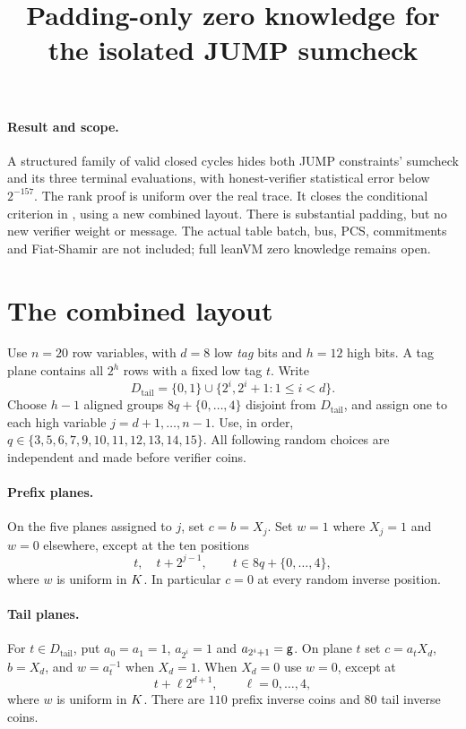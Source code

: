 \documentclass[11pt]{article}
\title{Padding-only zero knowledge for the isolated JUMP sumcheck}
\author{}
\date{}
\begin{document}
\maketitle
\vspace{-2em}

\paragraph{Result and scope.} A structured family of valid closed cycles hides both JUMP constraints' sumcheck and its three terminal evaluations, with honest-verifier statistical error below $2^{-157}$. The rank proof is uniform over the real trace. It closes the conditional criterion in , using a new combined layout. There is substantial padding, but no new verifier weight or message. The actual table batch, bus, PCS, commitments and Fiat-Shamir are not included; full leanVM zero knowledge remains open.

\section{The combined layout}

Use $n=20$ row variables, with $d=8$ low \emph{tag} bits and $h=12$ high bits. A tag plane contains all $2^h$ rows with a fixed low tag $t$. Write
\[
 D_{\mathrm{tail}}=\{0,1\}\cup\{2^i,2^i+1:1\le i<d\}.
\]
Choose $h-1$ aligned groups $8q+\{0,\ldots,4\}$ disjoint from $D_{\mathrm{tail}}$, and assign one to each high variable $j=d+1,\ldots,n-1$. Use, in order, $q\in\{3,5,6,7,9,10,11,12,13,14,15\}$. All following random choices are independent and made before verifier coins.

\paragraph{Prefix planes.} On the five planes assigned to $j$, set $c=b=X_j$. Set $w=1$ where $X_j=1$ and $w=0$ elsewhere, except at the ten positions
\[
 t,\quad t+2^{j-1},\qquad t\in8q+\{0,\ldots,4\},
\]
where $w$ is uniform in $K$. In particular $c=0$ at every random inverse position.

\paragraph{Tail planes.} For $t\in D_{\mathrm{tail}}$, put $a_0=a_1=1$, $a_{2^i}=1$ and $a_{2^i+1}=\mathsf{g}$. On plane $t$ set $c=a_tX_d$, $b=X_d$, and $w=a_t^{-1}$ when $X_d=1$. When $X_d=0$ use $w=0$, except at
\[
 t+\ell 2^{d+1},\qquad \ell=0,\ldots,4,
\]
where $w$ is uniform in $K$. There are $110$ prefix inverse coins and $80$ tail inverse coins.
\end{document}
